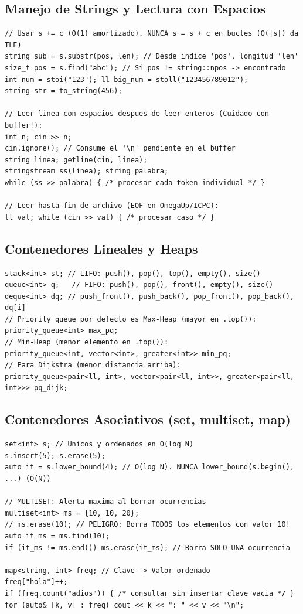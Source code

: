 \documentclass[9pt,twocolumn,a4paper]{extarticle}
\begin{document}
\subsection{Manejo de Strings y Lectura con Espacios}
\begin{lstlisting}
// Usar s += c (O(1) amortizado). NUNCA s = s + c en bucles (O(|s|) da TLE)
string sub = s.substr(pos, len); // Desde indice 'pos', longitud 'len'
size_t pos = s.find("abc"); // Si pos != string::npos -> encontrado
int num = stoi("123"); ll big_num = stoll("123456789012");
string str = to_string(456);

// Leer linea con espacios despues de leer enteros (Cuidado con buffer!):
int n; cin >> n;
cin.ignore(); // Consume el '\n' pendiente en el buffer
string linea; getline(cin, linea);
stringstream ss(linea); string palabra;
while (ss >> palabra) { /* procesar cada token individual */ }

// Leer hasta fin de archivo (EOF en OmegaUp/ICPC):
ll val; while (cin >> val) { /* procesar caso */ }
\end{lstlisting}

\subsection{Contenedores Lineales y Heaps}
\begin{lstlisting}
stack<int> st; // LIFO: push(), pop(), top(), empty(), size()
queue<int> q;   // FIFO: push(), pop(), front(), empty(), size()
deque<int> dq; // push_front(), push_back(), pop_front(), pop_back(), dq[i]
// Priority queue por defecto es Max-Heap (mayor en .top()):
priority_queue<int> max_pq;
// Min-Heap (menor elemento en .top()):
priority_queue<int, vector<int>, greater<int>> min_pq;
// Para Dijkstra (menor distancia arriba):
priority_queue<pair<ll, int>, vector<pair<ll, int>>, greater<pair<ll, int>>> pq_dijk;
\end{lstlisting}

\subsection{Contenedores Asociativos (set, multiset, map)}
\begin{lstlisting}
set<int> s; // Unicos y ordenados en O(log N)
s.insert(5); s.erase(5);
auto it = s.lower_bound(4); // O(log N). NUNCA lower_bound(s.begin(), ...) (O(N))

// MULTISET: Alerta maxima al borrar ocurrencias
multiset<int> ms = {10, 10, 20};
// ms.erase(10); // PELIGRO: Borra TODOS los elementos con valor 10!
auto it_ms = ms.find(10);
if (it_ms != ms.end()) ms.erase(it_ms); // Borra SOLO UNA ocurrencia

map<string, int> freq; // Clave -> Valor ordenado
freq["hola"]++;
if (freq.count("adios")) { /* consultar sin insertar clave vacia */ }
for (auto& [k, v] : freq) cout << k << ": " << v << "\n";
\end{lstlisting}
\end{document}
